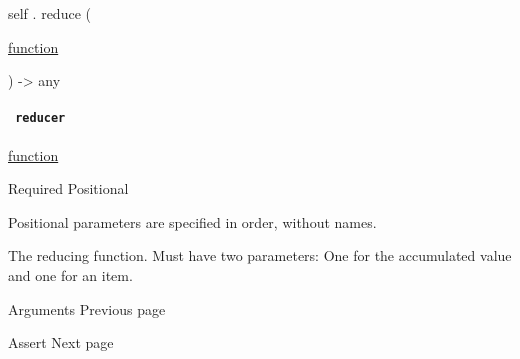 self { . } { reduce } (

{ \href{/docs/reference/foundations/function/}{function} }

) -\textgreater{} { any }

\paragraph{\texorpdfstring{\texttt{\ reducer\ }}{ reducer }}\label{definitions-reduce-reducer}

\href{/docs/reference/foundations/function/}{function}

{Required} {{ Positional }}

\label{definitions-reduce-reducer-positional-tooltip}
Positional parameters are specified in order, without names.

The reducing function. Must have two parameters: One for the accumulated
value and one for an item.

\href{/docs/reference/foundations/arguments/}{\pandocbounded{}}

{ Arguments } { Previous page }

\href{/docs/reference/foundations/assert/}{\pandocbounded{}}

{ Assert } { Next page }
